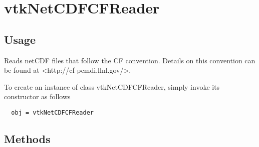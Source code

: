 \section{vtkNetCDFCFReader}

\subsection{Usage}


 Reads netCDF files that follow the CF convention.  Details on this convention
 can be found at <http://cf-pcmdi.llnl.gov/>.


To create an instance of class vtkNetCDFCFReader, simply
invoke its constructor as follows
\begin{verbatim}
  obj = vtkNetCDFCFReader
\end{verbatim}
\subsection{Methods}

